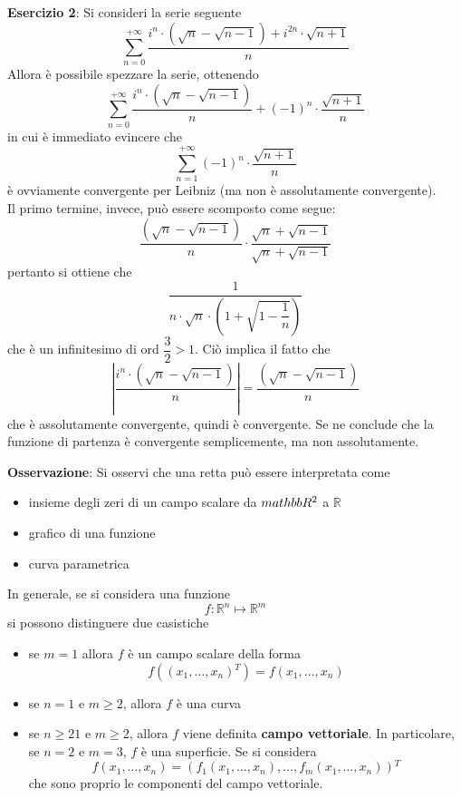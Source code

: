 \documentclass[a4paper]{extarticle}
\begin{document}
\vspace{1em}
\noindent
\textbf{Esercizio 2}: Si consideri la serie seguente
\[\sum_{n=0}^{+\infty} \frac{i^n \cdot \left(\sqrt{n} - \sqrt{n-1}\right) + i^{2n} \cdot \sqrt{n+1}}{n}\]
Allora è possibile spezzare la serie, ottenendo
\[\sum_{n=0}^{+\infty} \frac{i^n \cdot \left(\sqrt{n} - \sqrt{n-1}\right)}{n} + (-1)^n \cdot \frac{\sqrt{n+1}}{n}\]
in cui è immediato evincere che
\[\sum_{n=1}^{+\infty} (-1)^n \cdot \frac{\sqrt{n+1}}{n}\]
è ovviamente convergente per Leibniz (ma non è assolutamente convergente).\\
Il primo termine, invece, può essere scomposto come segue:
\[\frac{\left(\sqrt{n} - \sqrt{n-1}\right)}{n} \cdot \frac{\sqrt{n} + \sqrt{n-1}}{\sqrt{n} + \sqrt{n-1}}\]
pertanto si ottiene che
\[\dfrac{1}{n \cdot \sqrt{n} \cdot \left(1+\sqrt{1-\dfrac{1}{n}} \right)}\]
che è un infinitesimo di ord $\dfrac{3}{2}>1$. Ciò implica il fatto che
\[\left \vert \frac{i^n \cdot \left(\sqrt{n} - \sqrt{n-1}\right)}{n} \right \vert =  \frac{\left(\sqrt{n} - \sqrt{n-1}\right)}{n}\]
che è assolutamente convergente, quindi è convergente. Se ne conclude che la funzione di partenza è convergente semplicemente, ma non assolutamente.

\vspace{1em}
\noindent
\textbf{Osservazione}: Si osservi che una retta può essere interpretata come
\begin{itemize}
    \item insieme degli zeri di un campo scalare da $\\mathbb{R}^2$ a $\mathbb{R}$
    \item grafico di una funzione
    \item curva parametrica
\end{itemize}
In generale, se si considera una funzione
\[f : \mathbb{R}^n \longmapsto \mathbb{R}^m\]
si possono distinguere due casistiche
\begin{itemize}
    \item se $m=1$ allora $f$ è un campo scalare della forma
    \[f \left((x_1,\dots,x_n){^T}\right) = f(x_1,\dots,x_n)\]
    
    \item se $n=1$ e $m\geq 2$, allora $f$ è una curva
    \item se $n\geq 21$ e $m\geq 2$, allora $f$ viene definita \textbf{campo vettoriale}. In particolare, se $n=2$ e $m=3$, $f$ è una superficie. Se si considera
    \[f(x_1,\dots,x_n) = \left(f_1(x_1,\dots,x_n),\dots,f_m(x_1,\dots,x_n) \right){^T}\]
    che sono proprio le componenti del campo vettoriale.
\end{itemize}
\end{document}
